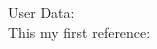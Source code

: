 \documentclass[a4paper, 11pt]{article}
\begin{document}
User Data: \cite{dataSource}\\
This my first reference: \cite{Emerson2001-gz}





\end{document}
